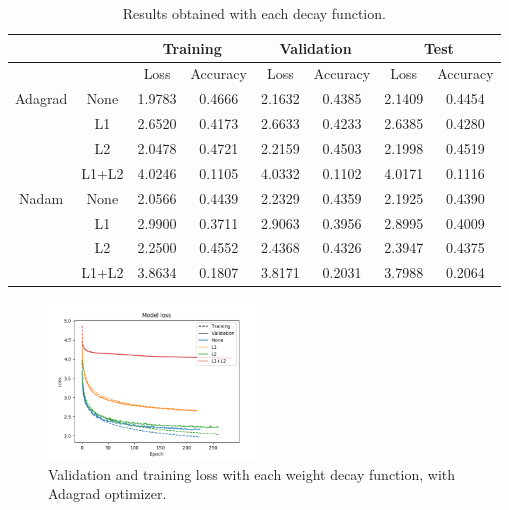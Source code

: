 \documentclass[]{article}
\begin{document}
\begin{table}[H]
	\centering
	\label{t:ker1}
	\begin{tabular}{@{}cccccccc@{}}
		\toprule
		&       & \multicolumn{2}{c}{Training} & \multicolumn{2}{c}{Validation} & \multicolumn{2}{c}{Test} \\ \midrule
		&       & Loss         & Accuracy      & Loss          & Accuracy       & Loss       & Accuracy    \\
		\midrule
		Adagrad & None  & 1.9783       & 0.4666        & 2.1632        & 0.4385         & 2.1409     & 0.4454      \\
		& L1    & 2.6520       & 0.4173        & 2.6633        & 0.4233         & 2.6385     & 0.4280      \\
		& L2    & 2.0478       & 0.4721        & 2.2159        & 0.4503         & 2.1998     & 0.4519      \\
		& L1+L2 & 4.0246       & 0.1105        & 4.0332        & 0.1102         & 4.0171     & 0.1116      \\
		\midrule
		Nadam   & None  & 2.0566       & 0.4439        & 2.2329        & 0.4359         & 2.1925     & 0.4390      \\
		& L1    & 2.9900       & 0.3711        & 2.9063        & 0.3956         & 2.8995     & 0.4009      \\
		& L2    & 2.2500       & 0.4552        & 2.4368        & 0.4326         & 2.3947     & 0.4375      \\
		& L1+L2 & 3.8634       & 0.1807        & 3.8171        & 0.2031         & 3.7988     & 0.2064      \\ \bottomrule
	\end{tabular}
	\caption{Results obtained with each decay function.}
\end{table}

\begin{figure}[H]
	\centering
	\includegraphics[width=0.5\textwidth]{weight1_adagrad_loss}
	\caption{Validation and training loss with each weight decay function, with Adagrad optimizer.}
	\label{f:ker1}
\end{figure}
\end{document}
